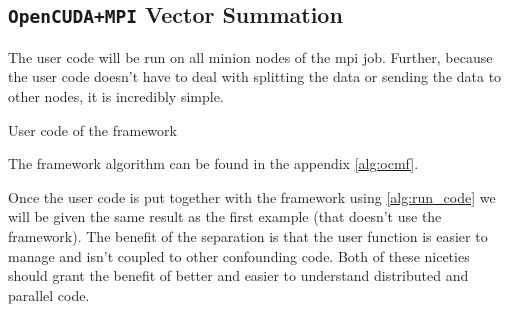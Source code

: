 \subsection{\texttt{OpenCUDA+MPI} Vector Summation}

The user code will be run on all minion nodes of the \gls{mpi} job. Further,
because the user code doesn't have to deal with splitting the data or sending
the data to other nodes, it is incredibly simple.

\begin{algorithm}
\begin{algorithmic}
\EndFunction{}
\end{algorithmic}
\label{alg:ocmf_user_code}
\caption{User code of the framework}
\end{algorithm}

The framework algorithm can be found in the appendix \cref{alg:ocmf}.

Once the user code is put together with the framework using \cref{alg:run_code}
we will be given the same result as the first example (that doesn't use the
framework). The benefit of the separation is that the user function is easier
to manage and isn't coupled to other confounding code. Both of these niceties
should grant the benefit of better and easier to understand distributed and
parallel code.
